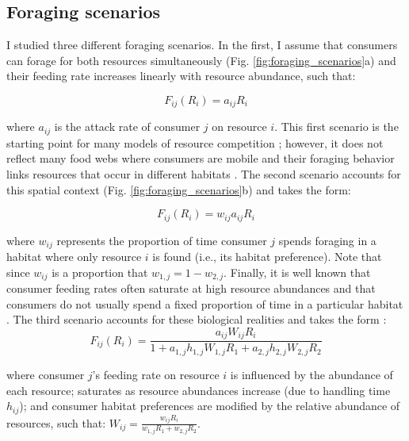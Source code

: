 \documentclass[11pt,]{article}
\begin{document}
\subsection{Foraging scenarios}\label{foraging-scenarios}

I studied three different foraging scenarios. In the first, I assume
that consumers can forage for both resources simultaneously (Fig.
\ref{fig:foraging_scenarios}a) and their feeding rate increases linearly
with resource abundance, such that:

\begin{equation} \label{eq:2}
  F_{ij}(R_i)=a_{ij}R_i
\end{equation}

where \(a_{ij}\) is the attack rate of consumer \(j\) on resource \(i\).
This first scenario is the starting point for many models of resource
competition \citep{MacArthur1972}; however, it does not reflect many
food webs where consumers are mobile and their foraging behavior links
resources that occur in different habitats \citep{McCann2005}. The
second scenario accounts for this spatial context (Fig.
\ref{fig:foraging_scenarios}b) and takes the form:

\begin{equation} \label{eq:3}
  F_{ij}(R_i)=w_{ij}a_{ij}R_i
\end{equation}

where \(w_{ij}\) represents the proportion of time consumer \(j\) spends
foraging in a habitat where only resource \(i\) is found (i.e., its
habitat preference). Note that since \(w_{ij}\) is a proportion that
\(w_{1,j}=1-w_{2,j}\). Finally, it is well known that consumer feeding
rates often saturate at high resource abundances
\citep{Holling1959, Rosenzweig1963, Murdoch2003, McCann2011} and that
consumers do not usually spend a fixed proportion of time in a
particular habitat \citep{McCann2005}. The third scenario accounts for
these biological realities and takes the form \citep[derived
by][]{McCann2005}:\\

\begin{equation} \label{eq:4}
  F_{ij}(R_i)=\frac{a_{ij}W_{ij}R_i}{1+a_{1,j}h_{1,j}W_{1,j}R_1+a_{2,j}h_{2,j}W_{2,j}R_2}
\end{equation}

where consumer \(j\)'s feeding rate on resource \(i\) is influenced by
the abundance of each resource; saturates as resource abundances
increase (due to handling time \(h_{ij}\)); and consumer habitat
preferences are modified by the relative abundance of resources, such
that: \(W_{ij}=\frac{w_{ij}R_i}{w_{1,j}R_1+w_{2,j}R_2}\).
\end{document}
